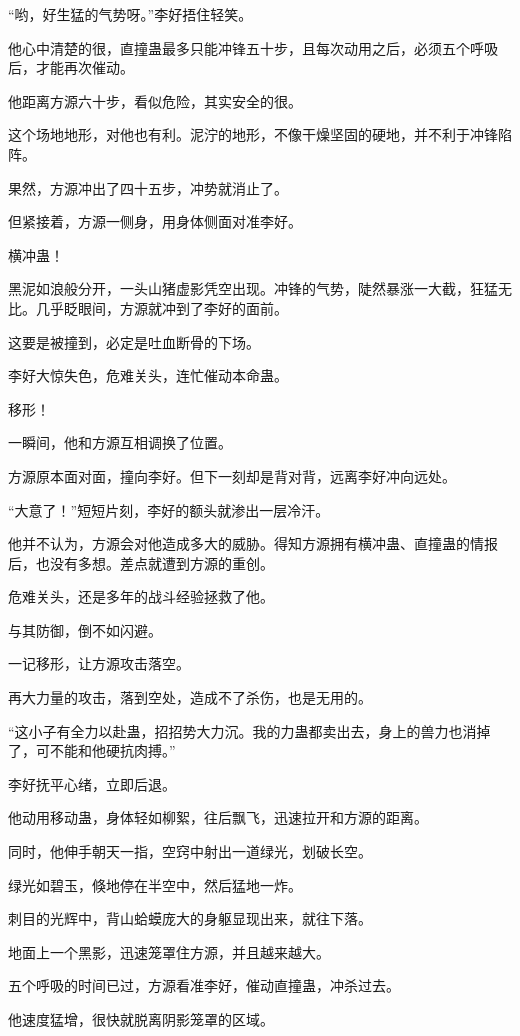\begin{this_body}
“哟，好生猛的气势呀。”李好捂住轻笑。

他心中清楚的很，直撞蛊最多只能冲锋五十步，且每次动用之后，必须五个呼吸后，才能再次催动。

他距离方源六十步，看似危险，其实安全的很。

这个场地地形，对他也有利。泥泞的地形，不像干燥坚固的硬地，并不利于冲锋陷阵。

果然，方源冲出了四十五步，冲势就消止了。

但紧接着，方源一侧身，用身体侧面对准李好。

横冲蛊！

黑泥如浪般分开，一头山猪虚影凭空出现。冲锋的气势，陡然暴涨一大截，狂猛无比。几乎眨眼间，方源就冲到了李好的面前。

这要是被撞到，必定是吐血断骨的下场。

李好大惊失色，危难关头，连忙催动本命蛊。

移形！

一瞬间，他和方源互相调换了位置。

方源原本面对面，撞向李好。但下一刻却是背对背，远离李好冲向远处。

“大意了！”短短片刻，李好的额头就渗出一层冷汗。

他并不认为，方源会对他造成多大的威胁。得知方源拥有横冲蛊、直撞蛊的情报后，也没有多想。差点就遭到方源的重创。

危难关头，还是多年的战斗经验拯救了他。

与其防御，倒不如闪避。

一记移形，让方源攻击落空。

再大力量的攻击，落到空处，造成不了杀伤，也是无用的。

“这小子有全力以赴蛊，招招势大力沉。我的力蛊都卖出去，身上的兽力也消掉了，可不能和他硬抗肉搏。”

李好抚平心绪，立即后退。

他动用移动蛊，身体轻如柳絮，往后飘飞，迅速拉开和方源的距离。

同时，他伸手朝天一指，空窍中射出一道绿光，划破长空。

绿光如碧玉，倏地停在半空中，然后猛地一炸。

刺目的光辉中，背山蛤蟆庞大的身躯显现出来，就往下落。

地面上一个黑影，迅速笼罩住方源，并且越来越大。

五个呼吸的时间已过，方源看准李好，催动直撞蛊，冲杀过去。

他速度猛增，很快就脱离阴影笼罩的区域。


\end{this_body}
